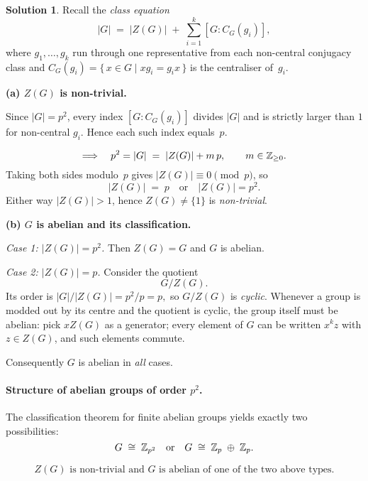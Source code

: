 \documentclass[12pt]{article}
\theoremstyle{definition} %
\newtheorem{solution}{Solution}
\theoremstyle{plain} %
\begin{document}
    \begin{solution}
    Recall the \emph{class equation}
    \[
       |G| \;=\; |Z(G)| \;+\;
                \sum_{i=1}^{k} [G : C_{G}(g_{i})],
    \]
    where $g_{1},\dots,g_{k}$ run through one representative from each
    non-central conjugacy class
    and $C_{G}(g_{i})=\{\,x\in G \mid xg_{i}=g_{i}x\,\}$ is the
    centraliser of~$g_{i}$.
    
    \bigskip
    \textbf{(a)  $Z(G)$ is non-trivial.}
    
    Since $|G|=p^{2}$, every index $[G : C_{G}(g_{i})]$ divides $|G|$ and is
    strictly larger than $1$ for non-central $g_{i}$.
    Hence each such index equals~$p$.
    
    \[
       \Longrightarrow\quad
       p^{2}=|G|
       \;=\;
       |Z(G)| + m\,p,
       \qquad m\in\Bbb Z_{\ge0}.
    \]
    Taking both sides modulo~$p$ gives $|Z(G)|\equiv0\pmod{p}$, so
    \[
       |Z(G)| \;=\; p \quad\text{or}\quad |Z(G)|=p^{2}.
    \]
    Either way $|Z(G)|>1$, hence $Z(G)\neq\{1\}$ is \emph{non-trivial}.
    
    \bigskip
    \textbf{(b)  $G$ is abelian and its classification.}
    
    \smallskip
    \emph{Case 1: $|Z(G)|=p^{2}$.}\;
    Then $Z(G)=G$ and $G$ is abelian.
    
    \smallskip
    \emph{Case 2: $|Z(G)|=p$.}\;
    Consider the quotient
    \[
       G/Z(G).
    \]
    Its order is
    \(
       |G|/|Z(G)| = p^{2}/p = p,
    \)
    so $G/Z(G)$ is \emph{cyclic}.
    Whenever a group is modded out by its centre and the quotient is
    cyclic, the group itself must be abelian:
    pick $xZ(G)$ as a generator;
    every element of $G$ can be written $x^{k}z$ with $z\in Z(G)$, and such
    elements commute.
    
    \medskip
    Consequently $G$ is abelian in \emph{all} cases.
    
    \paragraph{Structure of abelian groups of order $p^{2}$.}
    The classification theorem for finite abelian groups yields exactly two
    possibilities:
    \[
       G \;\cong\; \Bbb Z_{p^{2}}
       \quad\text{or}\quad
       G \;\cong\; \Bbb Z_{p}\;\oplus\;\Bbb Z_{p}.
    \]
    
    \smallskip
    \[
       \boxed{\;Z(G)\text{ is non-trivial and }G\text{ is abelian of one of
       the two above types.}\;}
    \]
    \end{solution}
\end{document}
